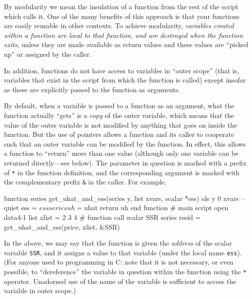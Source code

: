 By modularity we mean the insulation of a function from the rest of
the script which calls it.  One of the many benefits of this approach
is that your functions are easily reusable in other contexts.  To
achieve modularity, \emph{variables created within a function are
  local to that function, and are destroyed when the function exits},
unless they are made available as return values and these values are
``picked up'' or assigned by the caller.
    
In addition, functions do not have access to variables in ``outer
scope'' (that is, variables that exist in the script from which the
function is called) except insofar as these are explicitly passed to
the function as arguments.

By default, when a variable is passed to a function as an argument,
what the function actually ``gets'' is a \emph{copy} of the outer
variable, which means that the value of the outer variable is not
modified by anything that goes on inside the function.  But the use of
pointers allows a function and its caller to cooperate such that an
outer variable can be modified by the function.  In effect, this
allows a function to ``return'' more than one value (although only one
variable can be returned directly---see below).  The parameter in
question is marked with a prefix of \texttt{*} in the function
definition, and the corresponding argument is marked with the
complementary prefix \verb+&+ in the caller.  For example,
%
\begin{code}
function series get_uhat_and_ess(series y, list xvars, scalar *ess)
  ols y 0 xvars --quiet
  ess = $ess
  series uh = $uhat
  return uh
end function
# main script
open data4-1
list xlist = 2 3 4
# function call
scalar SSR
series resid = get_uhat_and_ess(price, xlist, &SSR)
\end{code}
%
In the above, we may say that the function is given the \emph{address}
of the scalar variable \texttt{SSR}, and it assigns a value to that
variable (under the local name \texttt{ess}).  (For anyone used to
programming in C: note that it is not necessary, or even possible, to
``dereference'' the variable in question within the function using the
\texttt{*} operator.  Unadorned use of the name of the variable is
sufficient to access the variable in outer scope.)

